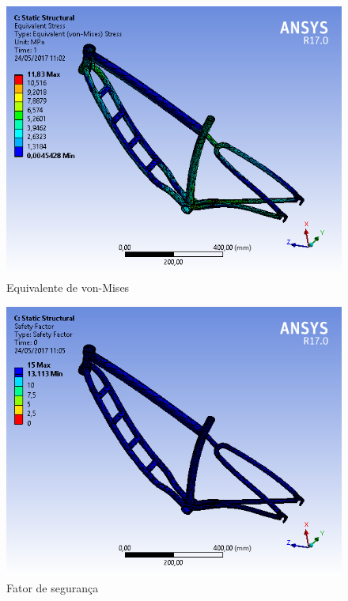 	\graphicspath{{figuras/}}
	\begin{figure}[h!]
		\centering
		\includegraphics[scale=0.60]{inter_von-Mises.png}
		\caption{Equivalente de von-Mises}
		\label{img:inter_von-Mises}
	\end{figure}
	
	\graphicspath{{figuras/}}
	\begin{figure}[h!]
		\centering
		\includegraphics[scale=0.60]{inter_fator_de_seguranca.png}
		\caption{Fator de segurança}
		\label{img:inter_fator_de_seguranca}
	\end{figure}
	
